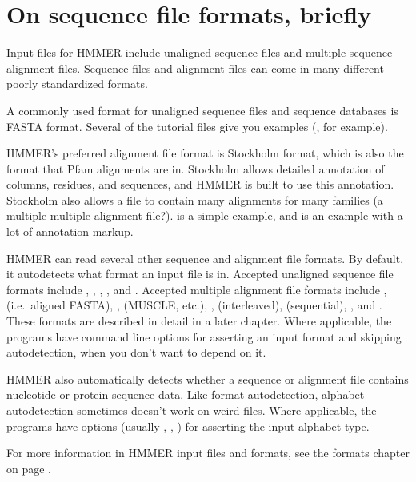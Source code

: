 \section{On sequence file formats, briefly}

Input files for HMMER include unaligned sequence files and multiple
sequence alignment files. Sequence files and alignment files can come
in many different poorly standardized formats.

A commonly used format for unaligned sequence files and sequence
databases is FASTA format. Several of the tutorial files give you
examples (, for example).

HMMER's preferred alignment file format is Stockholm format, which is
also the format that Pfam alignments are in.  Stockholm allows
detailed annotation of columns, residues, and sequences, and HMMER is
built to use this annotation. Stockholm also
allows a file to contain many alignments for many families (a multiple
multiple alignment file?).  is a simple example,
and  is an example with a lot of annotation markup.

HMMER can read several other sequence and alignment file formats. By
default, it autodetects what format an input file is in.  Accepted
unaligned sequence file formats include , ,
, , and . Accepted multiple
alignment file formats include , 
(i.e.\ aligned FASTA), ,  (MUSCLE,
etc.), ,  (interleaved), 
(sequential), , and . These formats are
described in detail in a later chapter. Where applicable, the programs
have command line options for asserting an input format and skipping
autodetection, when you don't want to depend on it.

HMMER also automatically detects whether a sequence or alignment file
contains nucleotide or protein sequence data. Like format
autodetection, alphabet autodetection sometimes doesn't work on weird
files. Where applicable, the programs have options (usually
, , ) for asserting the
input alphabet type.

For more information in HMMER input files and formats, see the formats
chapter on page \pageref{chapter:formats}.
 

